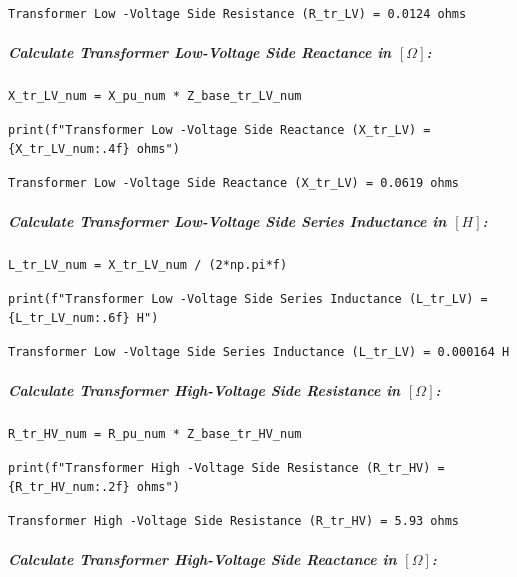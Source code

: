 \begin{verbatim}
Transformer Low -Voltage Side Resistance (R_tr_LV) = 0.0124 ohms
\end{verbatim}

\subparagraph{Calculate Transformer Low-Voltage Side Reactance in $\left[\Omega\right]$:}

\begin{verbatim}
X_tr_LV_num = X_pu_num * Z_base_tr_LV_num
\end{verbatim}

\begin{verbatim}
print(f"Transformer Low -Voltage Side Reactance (X_tr_LV) = {X_tr_LV_num:.4f} ohms")
\end{verbatim}

\begin{verbatim}
Transformer Low -Voltage Side Reactance (X_tr_LV) = 0.0619 ohms
\end{verbatim}

\subparagraph{Calculate Transformer Low-Voltage Side Series Inductance in $\left[H\right]$:}

\begin{verbatim}
L_tr_LV_num = X_tr_LV_num / (2*np.pi*f)
\end{verbatim}

\begin{verbatim}
print(f"Transformer Low -Voltage Side Series Inductance (L_tr_LV) = {L_tr_LV_num:.6f} H")
\end{verbatim}

\begin{verbatim}
Transformer Low -Voltage Side Series Inductance (L_tr_LV) = 0.000164 H
\end{verbatim}

\subparagraph{Calculate Transformer High-Voltage Side Resistance in $\left[\Omega\right]$:}

\begin{verbatim}
R_tr_HV_num = R_pu_num * Z_base_tr_HV_num
\end{verbatim}

\begin{verbatim}
print(f"Transformer High -Voltage Side Resistance (R_tr_HV) = {R_tr_HV_num:.2f} ohms")
\end{verbatim}

\begin{verbatim}
Transformer High -Voltage Side Resistance (R_tr_HV) = 5.93 ohms
\end{verbatim}

\subparagraph{Calculate Transformer High-Voltage Side Reactance in $\left[\Omega\right]$:}


